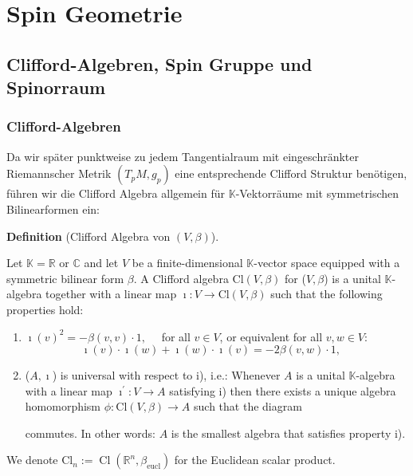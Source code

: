 \documentclass[10pt, letterpaper]{article}
\newcommand{\Cl}{\mathrm{Cl}}
\newcommand{\CustomHeading}[3]{%
  \par\medskip\noindent%
  \textbf{#1 #2} \textnormal{(#3)}.\enskip%
}
\newenvironment{DEF}[2]{\CustomHeading{Definition}{#1}{#2}}{}
\begin{document}
\pagebreak


\section{Spin Geometrie}


\subsection{Clifford-Algebren, Spin Gruppe und Spinorraum}



\subsubsection{Clifford-Algebren}

Da wir später punktweise zu jedem Tangentialraum mit eingeschränkter Riemannscher Metrik $(T_pM,g_p)$ eine entsprechende Clifford Struktur benötigen, führen wir die Clifford Algebra allgemein für $\mathbb{K}$-Vektorräume mit symmetrischen Bilinearformen ein: 

\begin{DEF}{}{Clifford Algebra von $(V,\beta)$}
  Let $\mathbb{K}=\mathbb{R}$ or $\mathbb{C}$ and let $V$ be a finite-dimensional $\mathbb{K}$-vector space equipped with a symmetric bilinear form $\beta$.
  A Clifford algebra $\Cl(V,\beta)$ for ($V, \beta$) is a unital $\mathbb{K}$-algebra together with a linear map $\imath: V \rightarrow \Cl(V,\beta)$ such that the following properties hold:
  \begin{enumerate}
    \item $\imath(v)^2=-\beta(v, v) \cdot 1, \quad$ for all $v \in V$, or equivalent for all $v, w \in V$:
    $$\imath(v) \cdot \imath(w)+\imath(w) \cdot \imath(v)=-2 \beta(v, w) \cdot 1, \quad$$
    \item ($A, \imath$) is universal with respect to i), i.e.: Whenever $A$ is a unital $\mathbb{K}$-algebra with a linear map $\imath^{\prime}: V \rightarrow A$ satisfying i) then there exists a unique algebra homomorphism $\phi: \Cl(V,\beta) \rightarrow A$ such that the diagram
    
    \begin{center}
    \end{center}

    commutes. In other words: $A$ is the smallest algebra that satisfies property i).
  \end{enumerate}
  We denote $\Cl_n:=\operatorname{Cl}\left(\mathbb{R}^n, \beta_{\mathrm{eucl}}\right)$ for the Euclidean scalar product.
  
\end{DEF}
\end{document}
